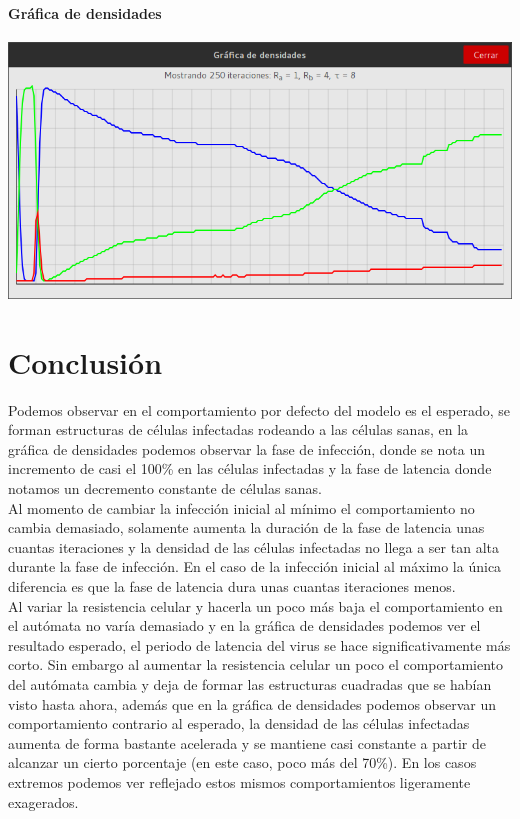 \documentclass[12pt,letterpaper,oneside]{report}
\begin{document}
	\subsubsection{Gráfica de densidades}
	\begin{center}
		\includegraphics[width=14cm]{img/tiempo/max/g.png}
	\end{center}


	\chapter{Conclusión}
	Podemos observar en el comportamiento por defecto del modelo es el esperado, se forman estructuras de células infectadas rodeando a las células sanas, en la gráfica de densidades podemos observar la fase de infección, donde se nota un incremento de casi el 100\% en las células infectadas y la fase de latencia donde notamos un decremento constante de células sanas.\\

	Al momento de cambiar la infección inicial al mínimo el comportamiento no cambia demasiado, solamente aumenta la duración de la fase de latencia unas cuantas iteraciones y la densidad de las células infectadas no llega a ser tan alta durante la fase de infección. En el caso de la infección inicial al máximo la única diferencia es que la fase de latencia dura unas cuantas iteraciones menos.\\

	Al variar la resistencia celular y hacerla un poco más baja el comportamiento en el autómata no varía demasiado y en la gráfica de densidades podemos ver el resultado esperado, el periodo de latencia del virus se hace significativamente más corto. Sin embargo al aumentar la resistencia celular un poco el comportamiento del autómata cambia y deja de formar las estructuras cuadradas que se habían visto hasta ahora, además que en la gráfica de densidades podemos observar un comportamiento contrario al esperado, la densidad de las células infectadas aumenta de forma bastante acelerada y se mantiene casi constante a partir de alcanzar un cierto porcentaje (en este caso, poco más del 70\%). En los casos extremos podemos ver reflejado estos mismos comportamientos ligeramente exagerados.\\
\end{document}
